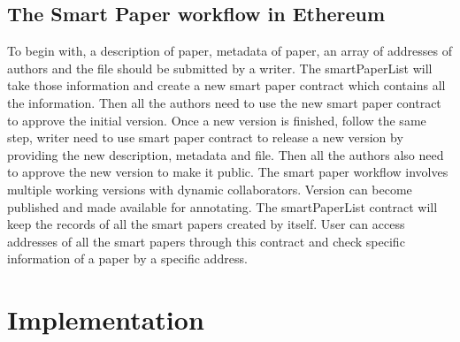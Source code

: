 \documentclass[openany,12pt]{ecsthesis}      %
\begin{document}
\section{The Smart Paper workflow in Ethereum}
To begin with, a description of paper, metadata of paper, an array of addresses of authors and the file should be submitted by a writer. 
The smartPaperList will take those information and create a new smart paper contract which contains all the information. 
Then all the authors need to use the new smart paper contract to approve the initial version. Once a new version is finished, 
follow the same step, 
writer need to use smart paper contract to release a new version by providing the new description, metadata and file.
Then all the authors also need to approve the new version to make it public.
The smart paper workflow involves multiple working versions with dynamic collaborators. 
Version can become published and made available for annotating.
The smartPaperList contract will keep the records of all the smart papers created by itself. 
User can access addresses of all the smart papers through this contract and check specific information of a paper by a specific address.
\chapter{Implementation}
\end{document}
